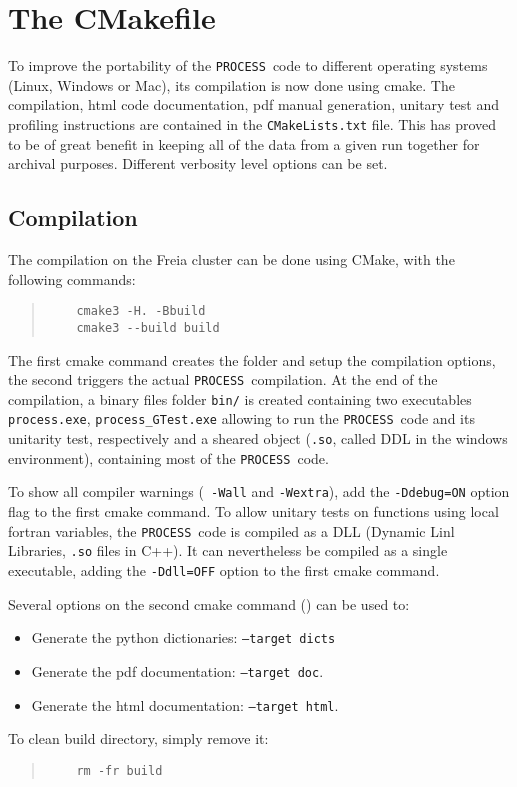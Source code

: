 \documentclass[11pt,a4paper]{report}
\newcommand{\process}{\mbox{\texttt{PROCESS}}}
\begin{document}
\section{The CMakefile}
\label{sec:makefile}

To improve the portability of the \process\ code to different operating systems (Linux, Windows or Mac), its compilation is now done using cmake. The compilation, html code documentation, pdf manual generation, unitary test and profiling instructions are contained in the \texttt{CMakeLists.txt} file. This has proved to be of great benefit in keeping all of the data from a given run together for archival purposes. Different verbosity level options can be set.

\subsection{Compilation}

The compilation on the Freia cluster can be done using CMake, with the following commands:

\begin{quote}
	\begin{verbatim}
	cmake3 -H. -Bbuild
	cmake3 --build build
	\end{verbatim}
\end{quote}

The first cmake command creates the folder and setup the compilation options, the second triggers the actual \process\ compilation. At the end of the compilation, a binary files folder \texttt{bin/} is created containing two executables \texttt{process.exe}, \texttt{process\_GTest.exe} allowing to run the \process\ code and its unitarity test, respectively and a sheared object (\texttt{.so}, called DDL in the windows environment), containing most of the \process\ code.\newline
	
To show all compiler warnings (\texttt{ -Wall} and \texttt{-Wextra}), add the \texttt{-Ddebug=ON} option flag to the first cmake command. To allow unitary tests on functions using local fortran variables, the \process\ code is compiled as a DLL (Dynamic Linl Libraries, \texttt{.so} files in C++). It can nevertheless be compiled as a single executable, adding the \texttt{-Ddll=OFF} option to the first cmake command.\newline

Several options on the second cmake command (\textcolor{gray}{}) can be used to:
\begin{itemize}
	\item Generate the python dictionaries: \texttt{--target dicts}
	\item Generate the pdf documentation: \texttt{--target doc}.
	\item Generate the html documentation: \texttt{--target html}.
\end{itemize}
To clean build directory, simply remove it:
\begin{quote}
	\begin{verbatim}
	rm -fr build 
	\end{verbatim}
\end{quote}
	
\end{document}
